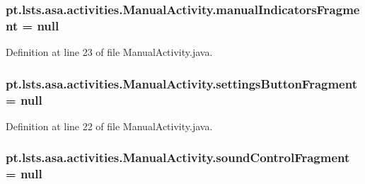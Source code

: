 \subsubsection[{manual\+Indicators\+Fragment}]{ pt.\+lsts.\+asa.\+activities.\+Manual\+Activity.\+manual\+Indicators\+Fragment = null\hspace{0.3cm}{\ttfamily [private]}}\label{classpt_1_1lsts_1_1asa_1_1activities_1_1ManualActivity_a776bbf934316db1b1c546f2e2ee0697c}


Definition at line 23 of file Manual\+Activity.\+java.

\hypertarget{classpt_1_1lsts_1_1asa_1_1activities_1_1ManualActivity_ae786eea58a48ddece364308cb94c29ac}{}
\subsubsection[{settings\+Button\+Fragment}]{ pt.\+lsts.\+asa.\+activities.\+Manual\+Activity.\+settings\+Button\+Fragment = null\hspace{0.3cm}{\ttfamily [private]}}\label{classpt_1_1lsts_1_1asa_1_1activities_1_1ManualActivity_ae786eea58a48ddece364308cb94c29ac}


Definition at line 22 of file Manual\+Activity.\+java.

\hypertarget{classpt_1_1lsts_1_1asa_1_1activities_1_1ManualActivity_ac664a082f9a3ef22e1f0c47f813812c6}{}
\subsubsection[{sound\+Control\+Fragment}]{ pt.\+lsts.\+asa.\+activities.\+Manual\+Activity.\+sound\+Control\+Fragment = null\hspace{0.3cm}{\ttfamily [private]}}\label{classpt_1_1lsts_1_1asa_1_1activities_1_1ManualActivity_ac664a082f9a3ef22e1f0c47f813812c6}


